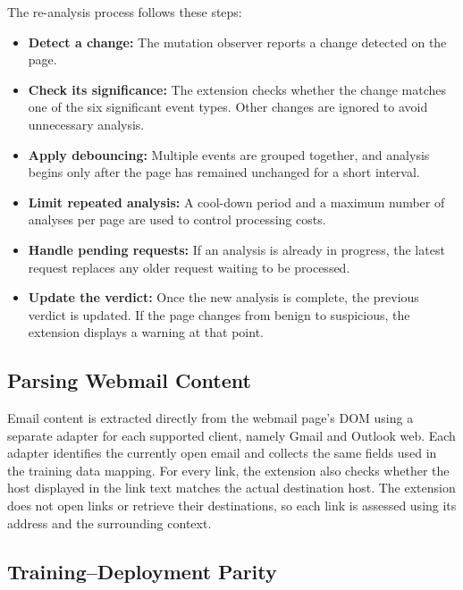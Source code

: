 \documentclass{FastFyp}
\begin{document}
The re-analysis process follows these steps:

\begin{itemize}
    \item \textbf{Detect a change:} The mutation observer reports a change detected on the page.

    \item \textbf{Check its significance:} The extension checks whether the change matches one of the six significant event types. Other changes are ignored to avoid unnecessary analysis.

    \item \textbf{Apply debouncing:} Multiple events are grouped together, and analysis begins only after the page has remained unchanged for a short interval.

    \item \textbf{Limit repeated analysis:} A cool-down period and a maximum number of analyses per page are used to control processing costs.

    \item \textbf{Handle pending requests:} If an analysis is already in progress, the latest request replaces any older request waiting to be processed.

    \item \textbf{Update the verdict:} Once the new analysis is complete, the previous verdict is updated. If the page changes from benign to suspicious, the extension displays a warning at that point.
\end{itemize}

\subsection{Parsing Webmail Content}
\label{sec:email-parsing}

Email content is extracted directly from the webmail page's DOM using a separate adapter for each supported client, namely Gmail and Outlook web. Each adapter identifies the currently open email and collects the same fields used in the training data mapping. For every link, the extension also checks whether the host displayed in the link text matches the actual destination host. The extension does not open links or retrieve their destinations, so each link is assessed using its address and the surrounding context.

\subsection{Training--Deployment Parity}
\label{sec:parity}
\end{document}
